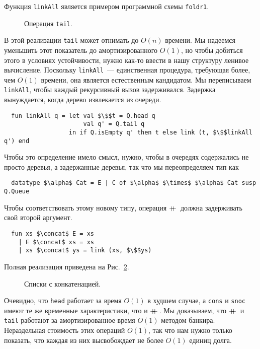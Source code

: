 \begin{remark}
  Функция \lstinline!linkAll! является примером программной схемы \lstinline!foldr1!.
\end{remark}

\begin{figure}
  \centering
  
  \caption{Операция \lstinline!tail!.}
  \label{fig:10.5}
\end{figure}
В этой реализации \lstinline!tail! может отнимать до $O(n)$
времени. Мы надеемся уменьшить этот показатель до амортизированного
$O(1)$, но чтобы добиться этого в условиях устойчивости,
нужно как-то ввести в нашу структуру ленивое вычисление. Поскольку
\lstinline!linkAll!~--- единственная процедура, требующая более, чем
$O(1)$ времени, она является естественным кандидатом. Мы переписываем
\lstinline!linkAll!, чтобы каждый рекурсивный вызов
задерживался. Задержка вынуждается, когда дерево извлекается из
очереди.
\begin{lstlisting}
  fun linkAll q = let val $\$$t = Q.head q
                      val q' = Q.tail q
                  in if Q.isEmpty q' then t else link (t, $\$$linkAll q') end
\end{lstlisting}
Чтобы это определение имело смысл, нужно, чтобы в очередях содержались
не просто деревья, а задержанные деревья, так что мы переопределяем
тип как
\begin{lstlisting}
  datatype $\alpha$ Cat = E | C of $\alpha$ $\times$ $\alpha$ Cat susp Q.Queue
\end{lstlisting}
Чтобы соответствовать этому новому типу, операция $+\!\!\!+\,$ должна
задерживать свой второй аргумент.
\begin{lstlisting}
  fun xs $\concat$ E = xs
    | E $\concat$ xs = xs
    | xs $\concat$ ys = link (xs, $\$$ys)
\end{lstlisting}
Полная реализация приведена на Рис.~\ref{fig:10.6}.

\begin{figure}
  \centering
  
  \caption{Списки с конкатенацией.}
  \label{fig:10.6}
\end{figure}

Очевидно, что \lstinline!head! работает за время $O(1)$ в худшем
случае, а \lstinline!cons! и \lstinline!snoc! имеют те же временные
характеристики, что и $+\!\!\!+\,$. Мы доказываем, что $+\!\!\!+\,$ и
\lstinline!tail! работают за амортизированное время $O(1)$ методом
банкира. Нераздельная стоимость этих операций $O(1)$, так
что нам нужно только показать, что каждая из них высвобождает не более
$O(1)$ единиц долга.

